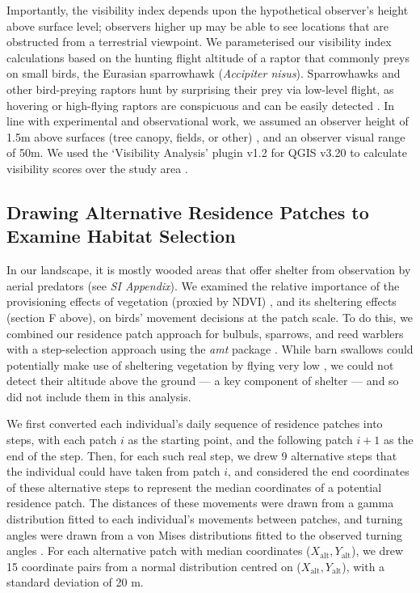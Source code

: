 Importantly, the visibility index depends upon the hypothetical observer's height above surface level; observers higher up may be able to see locations that are obstructed from a terrestrial viewpoint.
We parameterised our visibility index calculations based on the hunting flight altitude of a raptor that commonly preys on small birds, the Eurasian sparrowhawk (\textit{Accipiter nisus}).
Sparrowhawks and other bird-preying raptors hunt by surprising their prey via low-level flight, as hovering or high-flying raptors are conspicuous and can be easily detected \cite{krams2001,krams2020}.
In line with experimental and observational work, we assumed an observer height of 1.5m above surfaces (tree canopy, fields, or other) \citep{seress2011,krams2020}, and an observer visual range of 50m.
We used the `Visibility Analysis' plugin v1.2 for QGIS v3.20 to calculate visibility scores over the study area \citep{cuckovic2016}.

\subsection*{Drawing Alternative Residence Patches to Examine Habitat Selection}

In our landscape, it is mostly wooded areas that offer shelter from observation by aerial predators (see \textit{SI Appendix}).
We examined the relative importance of the provisioning effects of vegetation (proxied by NDVI) \cite{pettorelli2011}, and its sheltering effects (section F above), on birds' movement decisions at the patch scale.
To do this, we combined our residence patch approach for bulbuls, sparrows, and reed warblers with a step-selection approach \citep{thurfjell2014,avgar2016} using the \textit{amt} package \citep{signer2019}.
While barn swallows could potentially make use of sheltering vegetation by flying very low \cite{warrick2016}, we could not detect their altitude above the ground --- a key component of shelter --- and so did not include them in this analysis.

We first converted each individual's daily sequence of residence patches into steps, with each patch $i$ as the starting point, and the following patch $i+1$ as the end of the step.
Then, for each such real step, we drew 9 alternative steps that the individual could have taken from patch $i$, and considered the end coordinates of these alternative steps to represent the median coordinates of a potential residence patch.
The distances of these movements were drawn from a gamma distribution fitted to each individual's movements between patches, and turning angles were drawn from a von Mises distributions fitted to the observed turning angles \citep{signer2019}.
For each alternative patch with median coordinates ($X_\text{alt}, Y_\text{alt}$), we drew 15 coordinate pairs from a normal distribution centred on ($X_\text{alt}, Y_\text{alt}$), with a standard deviation of 20 m.

